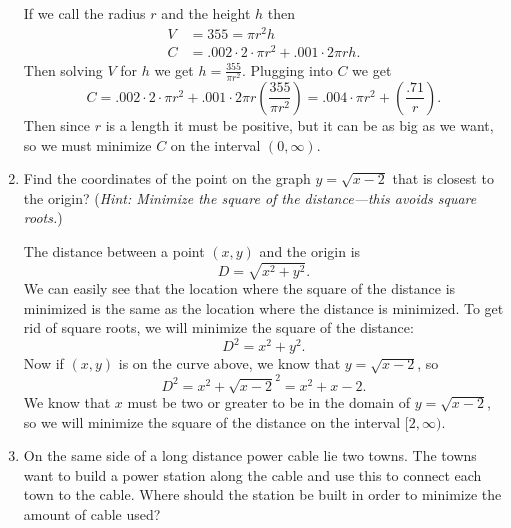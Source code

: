 \documentclass[11pt]{article}
\begin{document}
\begin{enumerate}
  \vfill
  {\color{blue}

    If we call the radius $r$ and the height $h$ then
    \begin{align*}
      V &= 355= \pi r^2 h\\
      C &= .002\cdot 2\cdot\pi r^2 + .001\cdot2\pi rh.
    \end{align*}
    Then solving $V$ for $h$ we get $h=\frac{355}{\pi r^2}$.  Plugging
    into $C$ we get
    \[
    C = .002\cdot 2\cdot\pi r^2 + .001\cdot2\pi r\left(\frac{355}{\pi
        r^2}\right) = .004\cdot\pi r^2 +
    \left(\frac{.71}{r}\right).
    \]
    Then since $r$ is a length it must be positive, but it can be as big as we want, so we must minimize $C$ on the
    interval $(0,\infty)$.

  }
  \vfill

  \newpage

\item Find the coordinates of the point on the graph $y=\sqrt{x-2}$
  that is closest to the origin? (\textit{Hint: Minimize the square of
    the distance---this avoids square roots.})

  \vfill
  {\color{blue}

    The distance between a point $(x,y)$ and the origin is
    \[
    D = \sqrt{x^2+y^2}.
    \]
    We can easily see that the location where the square of the
    distance is minimized is the same as the location where the
    distance is minimized.  To get rid of square roots, we will
    minimize the square of the distance:
    \[
    D^2=x^2+y^2.
    \]
    Now if $(x,y)$ is on the curve above, we know that $y=\sqrt{x-2}$,
    so
    \[
    D^2 = x^2+\sqrt{x-2}^2 = x^2+x-2.
    \]
    We know that $x$ must be two or greater to be in the domain of
    $y=\sqrt{x-2}$, so we will minimize the square of the distance on
    the interval $[2,\infty)$.


  }
  \vfill

  \newpage

\item On the same side of a long distance power cable lie two towns.
  The towns want to build a power station along the cable and use this
  to connect each town to the cable.  Where should the station be
  built in order to minimize the amount of cable used?

  \vfill
  
  \begin{center}


\end{center}
\end{enumerate}
\end{document}
